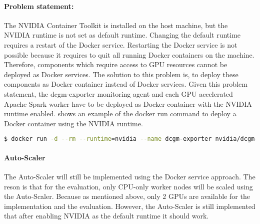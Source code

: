 \paragraph{Problem statement:}
The NVIDIA Container Toolkit is installed on the host machine, but the NVIDIA runtime is not set as default runtime.
Changing the default runtime requires a restart of the Docker service. Restarting the Docker service is not possible because it requires to quit all running Docker containers on the machine. Therefore, components which require access to GPU resources cannot be deployed as Docker services.
The solution to this problem is, to deploy these components as Docker container instead of Docker services.
Given this problem statement, the dcgm-exporter monitoring agent and each GPU accelerated Apache Spark worker have to be deployed as Docker container with the NVIDIA runtime enabled.
 shows an example of the docker run command to deploy a Docker container using the NVIDIA runtime.
\begin{lstlisting}[label=lst:06_env_prob_cmd, caption=Docker run command to deploy a container using the NVIDIA runtime, language=sh, numbers=none]
$ docker run -d --rm --runtime=nvidia --name dcgm-exporter nvidia/dcgm-exporter:latest
\end{lstlisting}

\paragraph{Auto-Scaler}
The Auto-Scaler will still be implemented using the Docker service approach. The reson is that for the evaluation, only CPU-only worker nodes will be scaled using the Auto-Scaler. Because as mentioned above, only 2 GPUs are available for the implementation and the evaluation.
However, the Auto-Scaler is still implemented that after enabling NVIDIA as the default runtime it should work.


